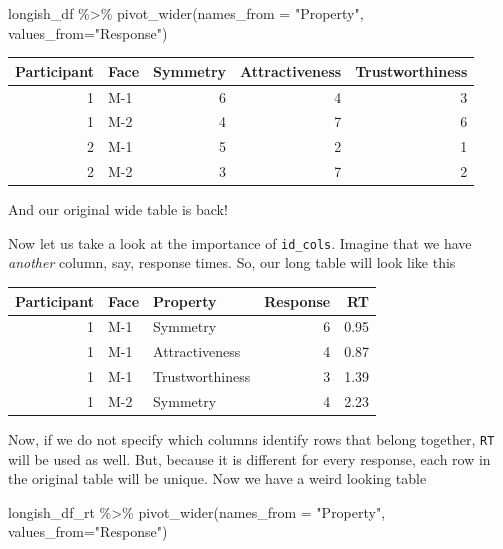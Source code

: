 \documentclass[
]{book}
\newenvironment{Shaded}{\begin{snugshade}}{\end{snugshade}}
\newcommand{\AttributeTok}[1]{\textcolor[rgb]{0.77,0.63,0.00}{#1}}
\newcommand{\FunctionTok}[1]{\textcolor[rgb]{0.00,0.00,0.00}{#1}}
\newcommand{\NormalTok}[1]{#1}
\newcommand{\SpecialCharTok}[1]{\textcolor[rgb]{0.00,0.00,0.00}{#1}}
\newcommand{\StringTok}[1]{\textcolor[rgb]{0.31,0.60,0.02}{#1}}
\begin{document}
\begin{Shaded}
\begin{Highlighting}[]
\NormalTok{longish\_df }\SpecialCharTok{\%\textgreater{}\%}
  \FunctionTok{pivot\_wider}\NormalTok{(}\AttributeTok{names\_from =} \StringTok{"Property"}\NormalTok{, }\AttributeTok{values\_from=}\StringTok{"Response"}\NormalTok{)}
\end{Highlighting}
\end{Shaded}

\begin{tabular}{r|l|r|r|r}
\hline
Participant & Face & Symmetry & Attractiveness & Trustworthiness\\
\hline
1 & M-1 & 6 & 4 & 3\\
\hline
1 & M-2 & 4 & 7 & 6\\
\hline
2 & M-1 & 5 & 2 & 1\\
\hline
2 & M-2 & 3 & 7 & 2\\
\hline
\end{tabular}

And our original wide table is back!

Now let us take a look at the importance of \texttt{id\_cols}. Imagine that we have \emph{another} column, say, response times. So, our long table will look like this

\begin{tabular}{r|l|l|r|r}
\hline
Participant & Face & Property & Response & RT\\
\hline
1 & M-1 & Symmetry & 6 & 0.95\\
\hline
1 & M-1 & Attractiveness & 4 & 0.87\\
\hline
1 & M-1 & Trustworthiness & 3 & 1.39\\
\hline
1 & M-2 & Symmetry & 4 & 2.23\\
\hline
\end{tabular}

Now, if we do not specify which columns identify rows that belong together, \texttt{RT} will be used as well. But, because it is different for every response, each row in the original table will be unique. Now we have a weird looking table

\begin{Shaded}
\begin{Highlighting}[]
\NormalTok{longish\_df\_rt }\SpecialCharTok{\%\textgreater{}\%}
  \FunctionTok{pivot\_wider}\NormalTok{(}\AttributeTok{names\_from =} \StringTok{"Property"}\NormalTok{, }\AttributeTok{values\_from=}\StringTok{"Response"}\NormalTok{)}
\end{Highlighting}
\end{Shaded}
\end{document}
